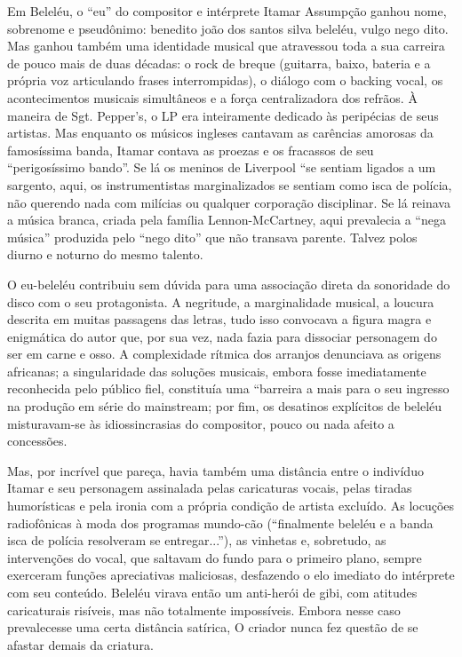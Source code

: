 Em Beleléu, o ``eu'' do compositor e intérprete Itamar Assumpção ganhou
nome, sobrenome e pseudônimo: benedito joão dos santos silva beleléu,
vulgo nego dito. Mas ganhou também uma identidade musical que atravessou
toda a sua carreira de pouco mais de duas décadas: o rock de breque
(guitarra, baixo, bateria e a própria voz articulando frases
interrompidas), o diálogo com o backing vocal, os acontecimentos
musicais simultâneos e a força centralizadora dos refrãos. À maneira de
Sgt. Pepper's, o LP era inteiramente dedicado às peripécias de seus
artistas. Mas enquanto os músicos ingleses cantavam as carências
amorosas da famosíssima banda, Itamar contava as proezas e os fracassos
de seu ``perigosíssimo bando''. Se lá os meninos de Liverpool ``se
sentiam ligados a um sargento, aqui, os instrumentistas marginalizados
se sentiam como isca de polícia, não querendo nada com milícias ou
qualquer corporação disciplinar. Se lá reinava a música branca, criada
pela família Lennon-McCartney, aqui prevalecia a ``nega música''
produzida pelo ``nego dito'' que não transava parente. Talvez polos
diurno e noturno do mesmo talento.

O eu-beleléu contribuiu sem dúvida para uma associação direta
da sonoridade do disco com o seu protagonista. A negritude, a
marginalidade musical, a loucura descrita em muitas passagens das
letras, tudo isso convocava a figura magra e enigmática do autor que,
por sua vez, nada fazia para dissociar personagem do ser em carne e
osso. A complexidade rítmica dos arranjos denunciava as origens
africanas; a singularidade das soluções musicais, embora fosse
imediatamente reconhecida pelo público fiel, constituía uma ``barreira a
mais para o seu ingresso na produção em série do mainstream; por fim, os
desatinos explícitos de beleléu misturavam-se às idiossincrasias do
compositor, pouco ou nada afeito a concessões.~

Mas, por incrível que pareça, havia também uma distância entre o
indivíduo Itamar e seu personagem assinalada pelas caricaturas vocais,
pelas tiradas humorísticas e pela ironia com a própria condição de
artista excluído. As locuções radiofônicas à moda dos programas
mundo-cão (``finalmente beleléu e a banda isca de polícia resolveram se
entregar...''), as vinhetas e, sobretudo, as intervenções do vocal, que
saltavam do fundo para o primeiro plano, sempre exerceram funções
apreciativas maliciosas, desfazendo o elo imediato do intérprete com seu
conteúdo. Beleléu virava então um anti-herói de gibi, com atitudes
caricaturais risíveis, mas não totalmente impossíveis. Embora nesse caso
prevalecesse uma certa distância satírica, O criador nunca fez questão
de se afastar demais da criatura.

